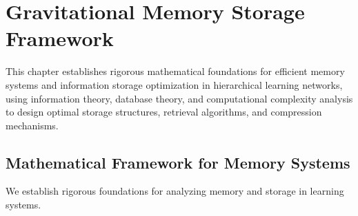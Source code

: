 \chapter{Gravitational Memory Storage Framework}

\begin{tcolorbox}[colback=DarkSkyBlue!5!white,colframe=DarkSkyBlue!75!black,title=Chapter Summary]
This chapter establishes rigorous mathematical foundations for efficient memory systems and information storage optimization in hierarchical learning networks, using information theory, database theory, and computational complexity analysis to design optimal storage structures, retrieval algorithms, and compression mechanisms.
\end{tcolorbox}

\section{Mathematical Framework for Memory Systems}

We establish rigorous foundations for analyzing memory and storage in learning systems.

